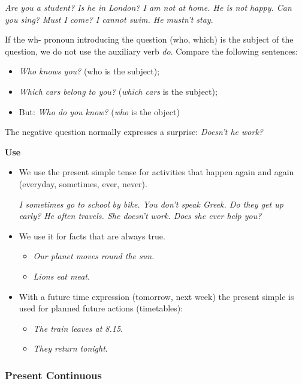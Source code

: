 \textit{Are you a student? Is he in London? I am not at home. He is not happy. Can you sing? Must I come? I cannot swim. He mustn't stay}.

If the wh- pronoun introducing the question (who, which) is the subject of the question, we do not use the auxiliary verb \textit{do}. Compare the following sentences:

\begin{itemize}
\item \textit{Who knows you?} (who is the subject);
\item \textit{Which cars belong to you?} (\textit{which cars} is the subject);
\item But: \textit{Who do you know?} (\textit{who} is the object)
\end{itemize}

The negative question normally expresses a surprise: \textit{Doesn't he work?}

\textbf{Use}

\begin{itemize} 

\item We use the present simple tense for activities that happen again and again (everyday, sometimes, ever, never).

\textit{I sometimes go to school by bike. You don't speak Greek. Do they get up early? He often travels. She doesn't work. Does she ever help you?}

\item We use it for facts that are always true.

\begin{itemize}
\item\textit{Our planet moves round the sun}.
\item\textit{Lions eat meat}.
\end{itemize}

\item With a future time expression (tomorrow, next week) the present simple is used for planned future actions (timetables):

\begin{itemize}
\item\textit{The train leaves at 8.15}.
\item\textit{They return tonight}.
\end{itemize}

\end{itemize}

\subsubsection{Present Continuous}

